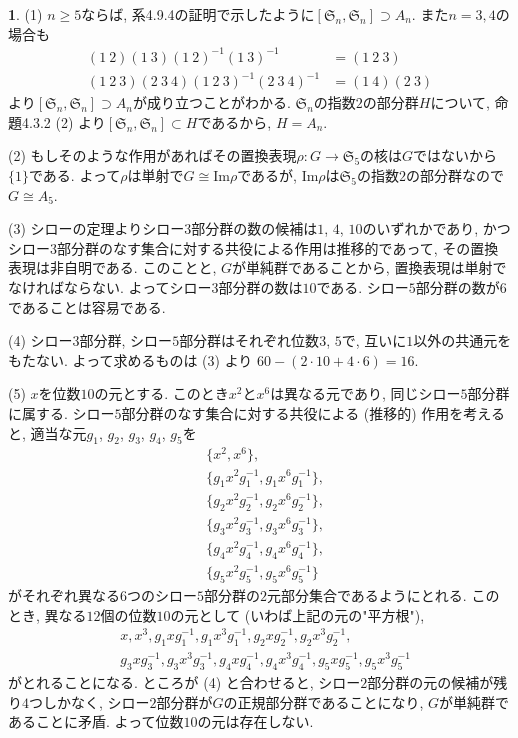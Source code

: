 \documentclass{article}
\theoremstyle{definition}
\newtheorem{ans}{}
\numberwithin{ans}{subsection}
\begin{document}
\begin{ans}
  (1) $n \ge 5$ならば, 系4.9.4の証明で示したように$[\mathfrak{S}_n, \mathfrak{S}_n] \supset A_n$.
  また$n = 3, 4$の場合も
  \begin{align*}
    (1\ 2)(1\ 3)(1\ 2)^{-1}(1\ 3)^{-1} &= (1\ 2\ 3) \\
    (1\ 2\ 3)(2\ 3\ 4)(1\ 2\ 3)^{-1}(2\ 3\ 4)^{-1} &= (1\ 4)(2\ 3)
  \end{align*}
  より$[\mathfrak{S}_n, \mathfrak{S}_n] \supset A_n$が成り立つことがわかる.
  $\mathfrak{S}_n$の指数$2$の部分群$H$について, 命題4.3.2 (2) より$[\mathfrak{S}_n, \mathfrak{S}_n] \subset H$であるから,
  $H = A_n$.

  (2) もしそのような作用があればその置換表現$\rho: G \rightarrow \mathfrak{S}_5$の核は$G$ではないから$\{ 1 \}$である.
  よって$\rho$は単射で$G \cong \mathrm{Im}\rho$であるが,
  $\mathrm{Im}\rho$は$\mathfrak{S}_5$の指数$2$の部分群なので$G \cong A_5$.

  (3) シローの定理よりシロー$3$部分群の数の候補は$1$, $4$, $10$のいずれかであり,
  かつシロー$3$部分群のなす集合に対する共役による作用は推移的であって, その置換表現は非自明である.
  このことと, $G$が単純群であることから, 置換表現は単射でなければならない.
  よってシロー$3$部分群の数は$10$である.
  シロー$5$部分群の数が$6$であることは容易である.

  (4) シロー$3$部分群, シロー$5$部分群はそれぞれ位数$3$, $5$で, 互いに$1$以外の共通元をもたない.
  よって求めるものは (3) より $60 - (2 \cdot 10 + 4 \cdot 6) = 16$.

  (5) $x$を位数$10$の元とする. このとき$x^2$と$x^6$は異なる元であり, 同じシロー$5$部分群に属する.
  シロー$5$部分群のなす集合に対する共役による (推移的) 作用を考えると, 適当な元$g_1$, $g_2$, $g_3$, $g_4$, $g_5$を
  \begin{align*}
    &\{ x^2, x^6 \}, \\
    &\{ g_1x^2g_1^{-1}, g_1x^6g_1^{-1} \}, \\
    &\{ g_2x^2g_2^{-1}, g_2x^6g_2^{-1} \}, \\
    &\{ g_3x^2g_3^{-1}, g_3x^6g_3^{-1} \}, \\
    &\{ g_4x^2g_4^{-1}, g_4x^6g_4^{-1} \}, \\
    &\{ g_5x^2g_5^{-1}, g_5x^6g_5^{-1} \}
  \end{align*}
  がそれぞれ異なる$6$つのシロー$5$部分群の$2$元部分集合であるようにとれる.
  このとき, 異なる$12$個の位数$10$の元として (いわば上記の元の"平方根"),
  \begin{align*}
    &x, x^3, g_1xg_1^{-1}, g_1x^3g_1^{-1}, g_2xg_2^{-1}, g_2x^3g_2^{-1},\\
    &g_3xg_3^{-1}, g_3x^3g_3^{-1}, g_4xg_4^{-1}, g_4x^3g_4^{-1}, g_5xg_5^{-1}, g_5x^3g_5^{-1}
  \end{align*}
  がとれることになる.
  ところが (4) と合わせると, シロー$2$部分群の元の候補が残り$4$つしかなく, シロー$2$部分群が$G$の正規部分群であることになり, $G$が単純群であることに矛盾.
  よって位数$10$の元は存在しない.


\end{ans}
\end{document}
